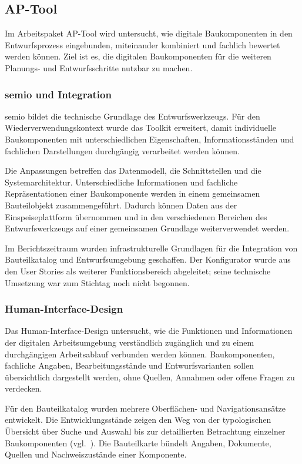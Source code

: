 \documentclass[type=zwischenbericht,theme=dark]{zukunftbau}
\begin{document}
\subsection{AP-Tool}

Im Arbeitspaket AP-Tool wird untersucht, wie digitale Baukomponenten in den Entwurfsprozess eingebunden, miteinander kombiniert und fachlich bewertet werden können. Ziel ist es, die digitalen Baukomponenten für die weiteren Planungs- und Entwurfsschritte nutzbar zu machen.

\subsubsection{semio und Integration}
semio bildet die technische Grundlage des Entwurfswerkzeugs. Für den Wiederverwendungskontext wurde das Toolkit erweitert, damit individuelle Baukomponenten mit unterschiedlichen Eigenschaften, Informationsständen und fachlichen Darstellungen durchgängig verarbeitet werden können.

Die Anpassungen betreffen das Datenmodell, die Schnittstellen und die Systemarchitektur. Unterschiedliche Informationen und fachliche Repräsentationen einer Baukomponente werden in einem gemeinsamen Bauteilobjekt zusammengeführt. Dadurch können Daten aus der Einspeiseplattform übernommen und in den verschiedenen Bereichen des Entwurfswerkzeugs auf einer gemeinsamen Grundlage weiterverwendet werden.

Im Berichtszeitraum wurden infrastrukturelle Grundlagen für die Integration von Bauteilkatalog und Entwurfsumgebung geschaffen. Der Konfigurator wurde aus den User Stories als weiterer Funktionsbereich abgeleitet; seine technische Umsetzung war zum Stichtag noch nicht begonnen.

\subsubsection{Human-Interface-Design}
\label{abschnitt:human-interface-design}
Das Human-Interface-Design untersucht, wie die Funktionen und Informationen der digitalen Arbeitsumgebung verständlich zugänglich und zu einem durchgängigen Arbeitsablauf verbunden werden können. Baukomponenten, fachliche Angaben, Bearbeitungsstände und Entwurfsvarianten sollen übersichtlich dargestellt werden, ohne Quellen, Annahmen oder offene Fragen zu verdecken.

Für den Bauteilkatalog wurden mehrere Oberflächen- und Navigationsansätze entwickelt. Die Entwicklungsstände zeigen den Weg von der typologischen Übersicht über Suche und Auswahl bis zur detaillierten Betrachtung einzelner Baukomponenten (vgl.\ ). Die Bauteilkarte bündelt Angaben, Dokumente, Quellen und Nachweiszustände einer Komponente.
\end{document}
